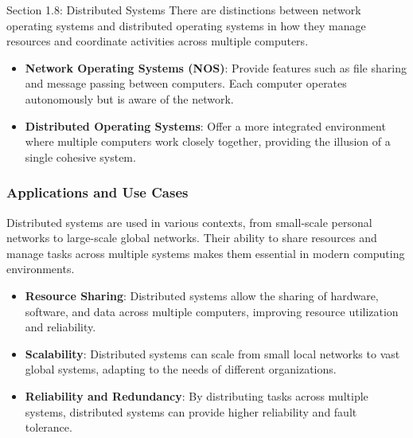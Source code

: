 \begin{notes}{Section 1.8: Distributed Systems}
    There are distinctions between network operating systems and distributed operating systems in how they manage resources and coordinate activities across multiple computers.
    
    \begin{highlight}
    
    \begin{itemize}
        \item \textbf{Network Operating Systems (NOS)}: Provide features such as file sharing and message passing between computers. Each computer operates autonomously but is aware of the network.
        \item \textbf{Distributed Operating Systems}: Offer a more integrated environment where multiple computers work closely together, providing the illusion of a single cohesive system.
    \end{itemize}
    
    \end{highlight}
    
    \subsubsection*{Applications and Use Cases}
    
    Distributed systems are used in various contexts, from small-scale personal networks to large-scale global networks. Their ability to share resources and manage tasks across multiple systems makes 
    them essential in modern computing environments.
    
    \begin{highlight}
    
    \begin{itemize}
        \item \textbf{Resource Sharing}: Distributed systems allow the sharing of hardware, software, and data across multiple computers, improving resource utilization and reliability.
        \item \textbf{Scalability}: Distributed systems can scale from small local networks to vast global systems, adapting to the needs of different organizations.
        \item \textbf{Reliability and Redundancy}: By distributing tasks across multiple systems, distributed systems can provide higher reliability and fault tolerance.
    \end{itemize}
    

\end{highlight}
\end{notes}
